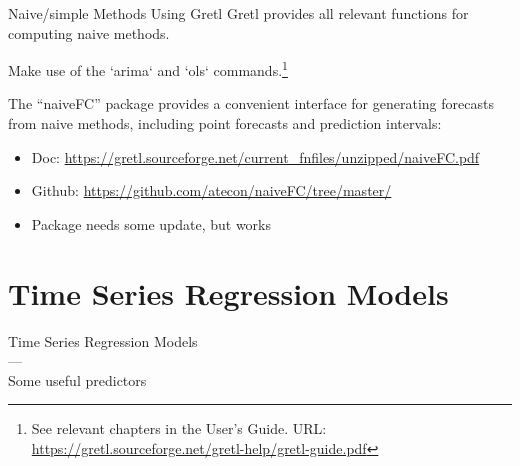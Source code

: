 \documentclass[11pt]{beamer}
\begin{document}
\begin{frame}{Naive/simple Methods Using Gretl}
	Gretl provides all relevant functions for computing naive methods.
	\vspace{0.3cm}

	Make use of the `arima` and `ols` commands.\footnote{See relevant chapters in the User's Guide. URL: \url{https://gretl.sourceforge.net/gretl-help/gretl-guide.pdf}}
	\vspace{0.3cm}

	The ``naiveFC'' package provides a convenient interface for generating forecasts from naive methods, including point forecasts and prediction intervals:
	\begin{itemize}
		\item Doc: \url{https://gretl.sourceforge.net/current_fnfiles/unzipped/naiveFC.pdf}
		\item Github: \url{https://github.com/atecon/naiveFC/tree/master/}
		\item Package needs some update, but works
	\end{itemize}
\end{frame}



\section{Time Series Regression Models}

\begin{frame}
	\begin{center}
		\Large
		Time Series Regression Models\\
		---\\
		Some useful predictors
	\end{center}
\end{frame}
\end{document}
